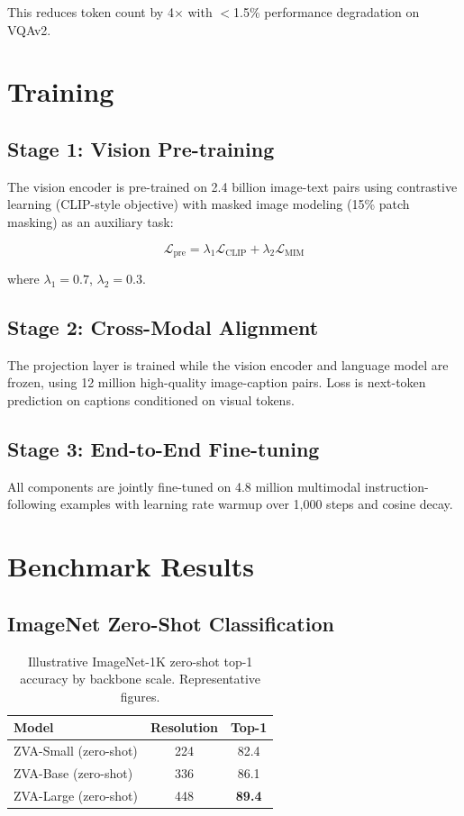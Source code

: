\documentclass[11pt,a4paper]{article}
\begin{document}
This reduces token count by 4$\times$ with $<$1.5\% performance degradation on VQAv2.

\section{Training}

\subsection{Stage 1: Vision Pre-training}

The vision encoder is pre-trained on 2.4 billion image-text pairs using contrastive learning (CLIP-style objective) with masked image modeling (15\% patch masking) as an auxiliary task:

\begin{equation}
\mathcal{L}_{\text{pre}} = \lambda_1 \mathcal{L}_{\text{CLIP}} + \lambda_2 \mathcal{L}_{\text{MIM}}
\end{equation}

where $\lambda_1 = 0.7$, $\lambda_2 = 0.3$.

\subsection{Stage 2: Cross-Modal Alignment}

The projection layer is trained while the vision encoder and language model are frozen, using 12 million high-quality image-caption pairs. Loss is next-token prediction on captions conditioned on visual tokens.

\subsection{Stage 3: End-to-End Fine-tuning}

All components are jointly fine-tuned on 4.8 million multimodal instruction-following examples with learning rate warmup over 1,000 steps and cosine decay.

\section{Benchmark Results}

\subsection{ImageNet Zero-Shot Classification}

\begin{table}[H]
\centering
\caption{Illustrative ImageNet-1K zero-shot top-1 accuracy by backbone scale. Representative figures.}
\label{tab:imagenet}
\begin{tabular}{lcc}
\toprule
Model & Resolution & Top-1 \\
\midrule
ZVA-Small (zero-shot) & 224 & 82.4 \\
ZVA-Base (zero-shot) & 336 & 86.1 \\
ZVA-Large (zero-shot) & 448 & \textbf{89.4} \\
\bottomrule
\end{tabular}
\end{table}
\end{document}
